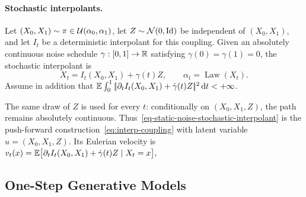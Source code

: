 \paragraph{Stochastic interpolants.}
\begin{defn}\label{def-stochastic-interpolant}
Let $(X_0,X_1)\sim\pi\in\mathcal{U}(\alpha_0,\alpha_1)$, let $Z\sim\mathcal{N}(0,\mathrm{Id})$ be independent of $(X_0,X_1)$, and let $I_t$ be a deterministic interpolant for this coupling. Given an absolutely continuous noise schedule $\gamma:[0,1]\to\mathbb{R}$ satisfying $\gamma(0)=\gamma(1)=0$, the stochastic interpolant is
\begin{equation}\label{eq-static-noise-stochastic-interpolant}
X_t=I_t(X_0,X_1)+\gamma(t)Z,
\qquad \alpha_t=\operatorname{Law}(X_t).
\end{equation}
Assume in addition that $\mathbb{E}\int_0^1|\!| \partial_tI_t(X_0,X_1)+\dot\gamma(t)Z |\!|^2\,\mathrm{d} t<+\infty$.
\end{defn}
The same draw of $Z$ is used for every $t$: conditionally on $(X_0,X_1,Z)$, the path remains absolutely continuous. Thus~\eqref{eq-static-noise-stochastic-interpolant} is the push-forward construction~\eqref{eq:interp-coupling} with latent variable $u=(X_0,X_1,Z)$. Its Eulerian velocity is
\(v_t(x)=\mathbb{E}\bigl[\partial_tI_t(X_0,X_1)+\dot\gamma(t)Z\mid X_t=x\bigr],\)
\subsection{One-Step Generative Models}
\label{sec-one-step-generative-models}
